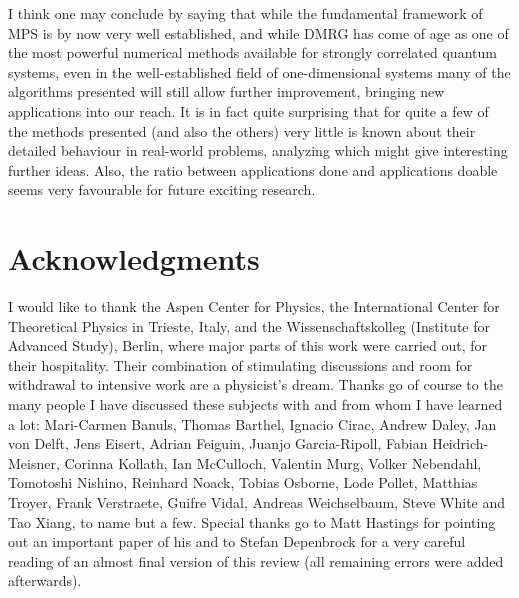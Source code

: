 I think one may conclude by saying that while the fundamental framework of MPS is by now very well established, and while DMRG has come of age as one of the most powerful numerical methods available for strongly correlated quantum systems, even in the well-established field of one-dimensional systems many of the algorithms presented will still allow further improvement, bringing new applications into our reach. It is in fact quite surprising that for quite a few of the methods presented (and also the others) very little is known about their detailed behaviour in real-world problems, analyzing which might give interesting further ideas. Also, the ratio between applications done and applications doable seems very favourable for future exciting research.

\section{Acknowledgments}
I would like to thank the Aspen Center for Physics, the International Center for Theoretical Physics in Trieste, Italy, and the Wissenschaftskolleg (Institute for Advanced Study), Berlin, where major parts of this work were carried out, for their hospitality. Their combination of stimulating discussions and room for withdrawal to intensive work are a physicist's dream. Thanks go of course to the many people I have discussed these subjects with and from whom I have learned a lot: Mari-Carmen Banuls, Thomas Barthel, Ignacio Cirac, Andrew Daley, Jan von Delft, Jens Eisert, Adrian Feiguin, Juanjo Garcia-Ripoll, Fabian Heidrich-Meisner, Corinna Kollath, Ian McCulloch, Valentin Murg, Volker Nebendahl, Tomotoshi Nishino, Reinhard Noack, Tobias Osborne, Lode Pollet, Matthias Troyer, Frank Verstraete, Guifre Vidal, Andreas Weichselbaum, Steve White and Tao Xiang, to name but a few. Special thanks go to Matt Hastings for pointing out an important paper of his and to Stefan Depenbrock for a very careful reading of an almost final version of this review (all remaining errors were added afterwards).


